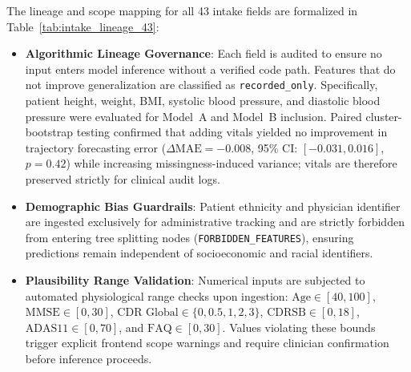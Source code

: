 \documentclass[11pt,a4paper]{article}
\begin{document}
The lineage and scope mapping for all 43 intake fields are formalized in Table~\ref{tab:intake_lineage_43}:
\begin{itemize}
    \item \textbf{Algorithmic Lineage Governance}: Each field is audited to ensure no input enters model inference without a verified code path. Features that do not improve generalization are classified as \texttt{recorded\_only}. Specifically, patient height, weight, BMI, systolic blood pressure, and diastolic blood pressure were evaluated for Model~A and Model~B inclusion. Paired cluster-bootstrap testing confirmed that adding vitals yielded no improvement in trajectory forecasting error ($\Delta\text{MAE} = -0.008$, 95\% CI: $[-0.031, 0.016]$, $p = 0.42$) while increasing missingness-induced variance; vitals are therefore preserved strictly for clinical audit logs.
    \item \textbf{Demographic Bias Guardrails}: Patient ethnicity and physician identifier are ingested exclusively for administrative tracking and are strictly forbidden from entering tree splitting nodes (\texttt{FORBIDDEN\_FEATURES}), ensuring predictions remain independent of socioeconomic and racial identifiers.
    \item \textbf{Plausibility Range Validation}: Numerical inputs are subjected to automated physiological range checks upon ingestion: $\text{Age} \in [40, 100]$, $\text{MMSE} \in [0, 30]$, $\text{CDR Global} \in \{0, 0.5, 1, 2, 3\}$, $\text{CDRSB} \in [0, 18]$, $\text{ADAS11} \in [0, 70]$, and $\text{FAQ} \in [0, 30]$. Values violating these bounds trigger explicit frontend scope warnings and require clinician confirmation before inference proceeds.
\end{itemize}
\end{document}
